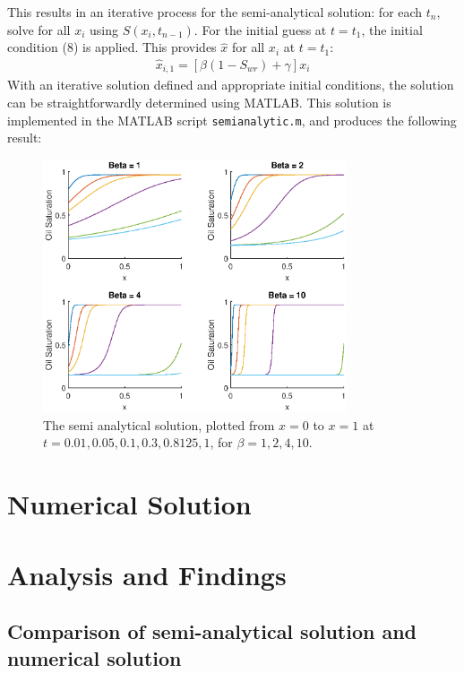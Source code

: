 \documentclass[11pt]{article}
\begin{document}
This results in an iterative process for the semi-analytical solution: for each $t_n$, solve for all $x_i$ using $S(x_i,t_{n-1})$. For the initial guess at $t=t_1$, the initial condition (8) is applied. This provides $\hat x$ for all $x_i$ at $t=t_1$:
\begin{eqnarray}
\hat x_{i,1} = \left[\beta (1-S_{wr})+\gamma\right]x_i
\end{eqnarray}
With an iterative solution defined and appropriate initial conditions, the solution can be straightforwardly determined using MATLAB. This solution is implemented in the MATLAB script \verb|semianalytic.m|, and produces the following result:
\begin{figure}[!h]
\centering
\includegraphics[width=0.8\textwidth]{semianalyticsolution.eps}
\caption{The semi analytical solution, plotted from $x=0$ to $x=1$ at $t=0.01, 0.05, 0.1, 0.3, 0.8125, 1$, for $\beta=1,2,4,10$.}
\end{figure}


\smallbreak
\section{Numerical Solution}

\smallbreak
\section{Analysis and Findings}
\subsection{Comparison of semi-analytical solution and numerical solution}
\end{document}
